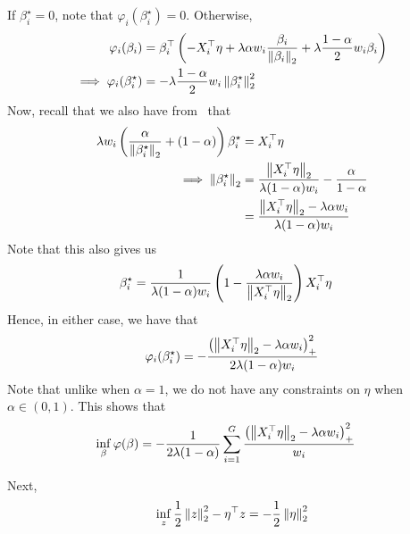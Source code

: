 If $\beta_i^\star = 0$, note that $\varphi_i(\beta_i^\star) = 0$.
Otherwise, 
\begin{align*}
    \varphi_i(\beta_i)
    &=
    \beta_i^\top \left(
        -X_i^\top \eta + \lambda \alpha w_i \frac{\beta_i}{\left\|\beta_i\right\|_2} + \lambda \frac{1-\alpha}{2} w_i \beta_i   
    \right)
    \\
    \implies
    \varphi_i(\beta_i^\star)
    &=
    -\lambda \frac{1-\alpha}{2} w_i \left\|\beta_i^\star\right\|_2^2
\end{align*}
Now, recall that we also have from~ that
\begin{align*}
    \lambda w_i \left(\frac{\alpha}{\left\|\beta_i^\star\right\|_2} + (1-\alpha)\right) \beta_i^\star
    &=
    X_i^\top \eta
    \\\implies
    \left\|\beta_i^\star\right\|_2
    &=
    \frac{\left\|X_i^\top \eta\right\|_2}{\lambda (1-\alpha) w_i} - \frac{\alpha}{1-\alpha}
    \\&=
    \frac{\left\|X_i^\top \eta\right\|_2 - \lambda \alpha w_i}{\lambda (1-\alpha) w_i}
\end{align*}
Note that this also gives us
\begin{align*}
    \beta_i^\star
    &=
    \frac{1}{\lambda (1-\alpha) w_i}
    \left(1 - \frac{\lambda \alpha w_i}{\left\|X_i^\top \eta\right\|_2}\right)
    X_i^\top \eta
\end{align*}
Hence, in either case, we have that
\begin{align*}
    \varphi_i(\beta_i^\star)
    =
    -\frac{\left(\left\|X_i^\top \eta\right\|_2 - \lambda \alpha w_i\right)_+^2}{2\lambda (1-\alpha) w_i}
\end{align*}
Note that unlike when $\alpha = 1$, we do not have any constraints on $\eta$ when $\alpha \in (0,1)$.
This shows that
\begin{align*}
    \inf\limits_{\beta}
    \varphi(\beta)
    &=
    -\frac{1}{2\lambda (1-\alpha)}
    \sum\limits_{i=1}^G
    \frac{\left(\left\|X_i^\top \eta\right\|_2 - \lambda \alpha w_i\right)_+^2}{w_i}
\end{align*}

Next,
\begin{align*}
    \inf\limits_{z} \frac{1}{2} \left\|z\right\|_2^2 - \eta^\top z
    =
    - \frac{1}{2} \left\|\eta\right\|_2^2
\end{align*}

